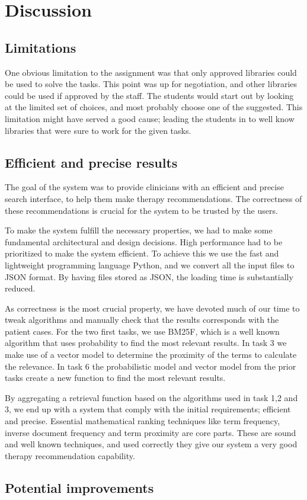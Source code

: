 \chapter{Discussion}
\label{cha:discussion}

\section{Limitations}
One obvious limitation to the assignment was that only approved libraries could be used to solve the tasks. This point was up for negotiation, and other libraries could be used if approved by the staff. The students would start out by looking at the limited set of choices, and most probably choose one of the suggested. This limitation might have served a good cause; leading the students in to well know libraries that were sure to work for the given tasks.

\section{Efficient and precise results}
The goal of the system was to provide clinicians with an efficient and precise search interface, to help them make therapy recommendations. The correctness of these recommendations is crucial for the system to be trusted by the users.

To make the system fulfill the necessary properties, we had to make some fundamental architectural and design decisions.
High performance had to be prioritized to make the system efficient. To achieve this we use the fast and lightweight programming language Python, and we convert all the input files to JSON format. By having files stored as JSON, the loading time is substantially reduced.

As correctness is the most crucial property, we have devoted much of our time to tweak algorithms and manually check that the results corresponds with the patient cases. For the two first tasks, we use BM25F, which is a well known algorithm that uses probability to find the most relevant results. In task 3 we make use of a vector model to determine the proximity of the terms to calculate the relevance. In task 6 the probabilistic model and vector model from the prior tasks create a new function to find the most relevant results.    

By aggregating a retrieval function based on the algorithms used in task 1,2 and 3, we end up with a system that comply with the initial requirements; efficient and precise. Essential mathematical ranking techniques like term frequency, inverse document frequency and term proximity are core parts. These are sound and well known techniques, and used correctly they give our system a very good therapy recommendation capability. 

\section{Potential improvements}






